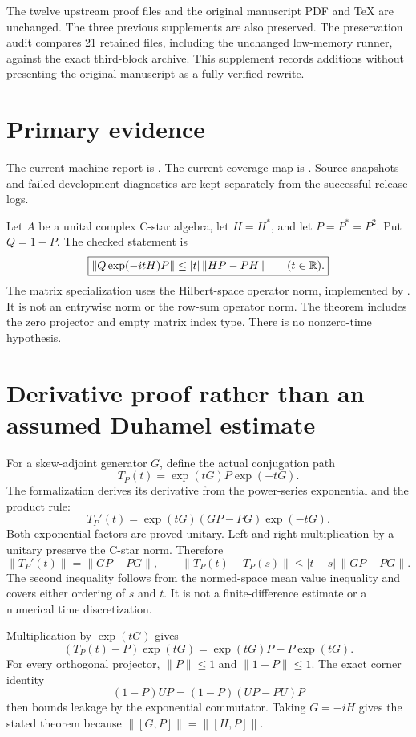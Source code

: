 \documentclass[10pt,letterpaper]{article}
\newcommand{\pageheading}[2]{\vspace*{2pt}{\small\color{ink}\textsc{#1}}\par\vspace{2pt}{\Large\bfseries #2}\par\vspace{4pt}}
\begin{document}
The twelve upstream proof files and the original manuscript PDF and TeX are unchanged. The three previous supplements are also preserved. The preservation audit compares 21 retained files, including the unchanged low-memory runner, against the exact third-block archive. This supplement records additions without presenting the original manuscript as a fully verified rewrite.

\section*{Primary evidence}
The current machine report is . The current coverage map is . Source snapshots and failed development diagnostics are kept separately from the successful release logs.

\newpage
\pageheading{Theorem 5.2 completed}{Quantitative leakage from the actual exponential}
Let $A$ be a unital complex C-star algebra, let $H=H^*$, and let $P=P^*=P^2$. Put $Q=1-P$. The checked statement is
\[
\boxed{\|Q\exp(-itH)P\|\le |t|\,\|HP-PH\|\qquad(t\in\mathbb R).}
\]
The matrix specialization uses the Hilbert-space operator norm, implemented by . It is not an entrywise norm or the row-sum operator norm. The theorem includes the zero projector and empty matrix index type. There is no nonzero-time hypothesis.

\section*{Derivative proof rather than an assumed Duhamel estimate}
For a skew-adjoint generator $G$, define the actual conjugation path
\[
T_P(t)=\exp(tG)P\exp(-tG).
\]
The formalization derives its derivative from the power-series exponential and the product rule:
\[
T_P'(t)=\exp(tG)(GP-PG)\exp(-tG).
\]
Both exponential factors are proved unitary. Left and right multiplication by a unitary preserve the C-star norm. Therefore
\[
\|T_P'(t)\|=\|GP-PG\|,
\qquad
\|T_P(t)-T_P(s)\|\le |t-s|\,\|GP-PG\|.
\]
The second inequality follows from the normed-space mean value inequality and covers either ordering of $s$ and $t$. It is not a finite-difference estimate or a numerical time discretization.

Multiplication by $\exp(tG)$ gives
\[
(T_P(t)-P)\exp(tG)=\exp(tG)P-P\exp(tG).
\]
For every orthogonal projector, $\|P\|\le1$ and $\|1-P\|\le1$. The exact corner identity
\[
(1-P)UP=(1-P)(UP-PU)P
\]
then bounds leakage by the exponential commutator. Taking $G=-iH$ gives the stated theorem because $\|[G,P]\|=\|[H,P]\|$.
\end{document}
